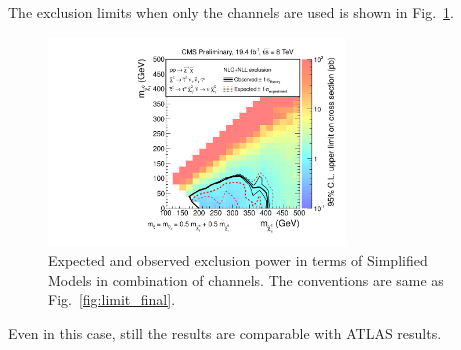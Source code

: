 The exclusion limits when only the \tauTau channels are used is shown in Fig.~\ref{fig:limit_tauTau}.
\begin{linenomath}
\begin{figure}[!Hhtb]
\centering
\includegraphics[width=0.7\textwidth,keepaspectratio=true]{StatisticsFig/ExclusionTauTau2Bin.pdf}
\caption{Expected and observed exclusion power in terms of Simplified Models
in combination of \tauTau channels. The conventions are same as Fig.~\ref{fig:limit_final}.}
\label{fig:limit_tauTau}
\end{figure}
\end{linenomath}
Even in this case, still the results are comparable with ATLAS results.


